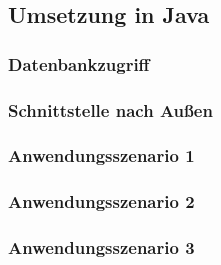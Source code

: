 \subsection{Umsetzung in Java}
\subsubsection{Datenbankzugriff}
\subsubsection{Schnittstelle nach Außen}
\subsubsection{Anwendungsszenario 1}
\subsubsection{Anwendungsszenario 2}
\subsubsection{Anwendungsszenario 3}